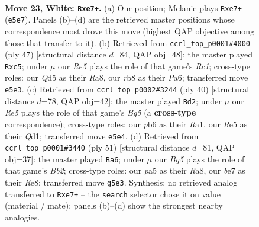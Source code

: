 \documentclass[11pt]{article}
\begin{document}
\clearpage

\begin{figure}[p]\centering
\begin{subfigure}{0.46\textwidth}\centering
\resizebox{\linewidth}{!}{%
\newchessgame
\chessboard[
  setfen={1rb1k2r/2q1b1pp/1p6/p2QR1B1/3p3P/8/PP3PP1/RN4K1 w - - 1 23},
  showmover=false,
  pgfstyle=straightmove, color=movearrow, markmove={e5-e7}
]}
\caption{}
\end{subfigure}\hfill
\begin{subfigure}{0.46\textwidth}\centering
\resizebox{\linewidth}{!}{%
\newchessgame
\chessboard[
  setfen={r1r2bk1/5p1p/p3q1p1/1pBRP3/5P2/7P/PPQ3P1/3R2K1 b - - 0 24},
  showmover=false,
  pgfstyle=straightmove, color=movearrow, markmove={c8-c5}
]}
\caption{}
\end{subfigure}
\\[4pt]
\begin{subfigure}{0.46\textwidth}\centering
\resizebox{\linewidth}{!}{%
\newchessgame
\chessboard[
  setfen={r2q2k1/1p1br1bp/p4pp1/n5B1/N7/8/PP3PP1/R2QRBK1 w - - 0 21},
  showmover=false,
  pgfstyle=straightmove, color=movearrow, markmove={g5-d2}
]}
\caption{}
\end{subfigure}\hfill
\begin{subfigure}{0.46\textwidth}\centering
\resizebox{\linewidth}{!}{%
\newchessgame
\chessboard[
  setfen={r3r1k1/1b3p1p/1q4p1/1BbPp3/1p2P3/7P/1B2QPP1/1R2R1K1 b - - 0 26},
  showmover=false,
  pgfstyle=straightmove, color=movearrow, markmove={b7-a6}
]}
\caption{}
\end{subfigure}
\caption{\textbf{Move 23, White: \texttt{Rxe7+}.} (a) Our position; Melanie plays \texttt{Rxe7+} (\texttt{e5e7}). Panels (b)--(d) are the retrieved master positions whose correspondence most drove this move (highest QAP objective among those that transfer to it). (b) Retrieved from \texttt{ccrl\_top\_p0001\#4000} (ply 47) [structural distance $d$=84, QAP obj=48]: the master played \texttt{Rxc5}; under $\mu$ our \emph{Re5} plays the role of that game's \emph{Rc1}; cross-type roles: our \emph{Q}d5 as their \emph{R}a8, our \emph{r}b8 as their \emph{P}a6; transferred move \texttt{e5e3}. (c) Retrieved from \texttt{ccrl\_top\_p0002\#3244} (ply 40) [structural distance $d$=78, QAP obj=42]: the master played \texttt{Bd2}; under $\mu$ our \emph{Re5} plays the role of that game's \emph{Bg5} (a \textbf{cross-type} correspondence); cross-type roles: our \emph{p}b6 as their \emph{R}a1, our \emph{R}e5 as their \emph{Q}d1; transferred move \texttt{e5e4}. (d) Retrieved from \texttt{ccrl\_top\_p0001\#3440} (ply 51) [structural distance $d$=81, QAP obj=37]: the master played \texttt{Ba6}; under $\mu$ our \emph{Bg5} plays the role of that game's \emph{Bb2}; cross-type roles: our \emph{p}a5 as their \emph{R}a8, our \emph{b}e7 as their \emph{R}e8; transferred move \texttt{g5e3}. Synthesis: no retrieved analog transferred to \texttt{Rxe7+} -- the \texttt{search} selector chose it on value (material / mate); panels (b)--(d) show the strongest nearby analogies.}
\label{fig:thought-m44}
\end{figure}
\end{document}
